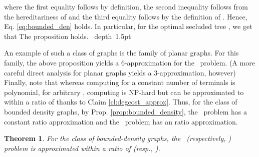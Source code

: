 \documentclass[12pt]{article}
\newtheorem{theorem}{Theorem}[section]
\def\blackslug{\hbox{\hskip 1pt \vrule width 4pt height 8pt
    depth 1.5pt \hskip 1pt}}
\def\QED{\quad\blackslug\lower 8.5pt\null\par}
\newcommand{\PS}[0]{ 
}
\newcommand{\PP}[0]{ }
\begin{document}
where the first equality follows by definition, the second inequality follows from the hereditariness of  and the third equality follows by the definition of .
Hence, Eq. \ref{eq:bounded_den} holds. In particular, for the optimal secluded tree , we get that  The proposition holds.
\QED
An example of such a class of graphs is the family of planar graphs. For this family, the above proposition yields a 6-approximation for the \PP\ problem. (A more careful direct analysis for planar graphs yields a 3-approximation, however) Finally, note that whereas computing  for a constant number of terminals  is polynomial, for arbitrary , computing  is NP-hard but can be approximated to within a ratio of  thanks to Claim \ref{cl:degcost_approx}. Thus, for the class of bounded density graphs, by Prop. \ref{prop:bounded_density}, the \PP\ problem has a constant ratio approximation and the \PS\ problem has an  ratio approximation.
\begin{theorem}
For the class of bounded-density graphs, the \PP\ (respectively, \PS) problem
is approximated within a ratio of  (resp., ).
\end{theorem}
\end{document}
